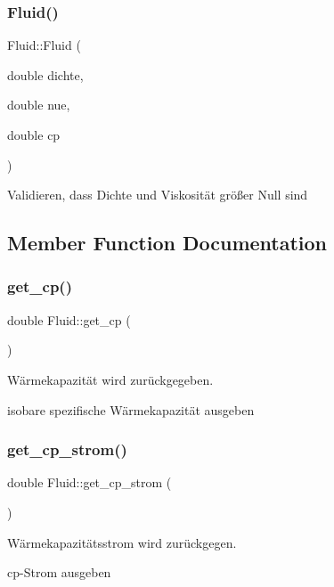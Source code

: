 \subsubsection{\texorpdfstring{Fluid()}{Fluid()}}
{\footnotesize\ttfamily Fluid\+::\+Fluid (\begin{DoxyParamCaption}\item[{double}]{dichte,  }\item[{double}]{nue,  }\item[{double}]{cp }\end{DoxyParamCaption})}

Validieren, dass Dichte und Viskosität größer Null sind 

\subsection{Member Function Documentation}
\mbox{\label{class_fluid_a86bf10785c4c5822eabf9245f0b39ae0}} 
\subsubsection{\texorpdfstring{get\+\_\+cp()}{get\_cp()}}
{\footnotesize\ttfamily double Fluid\+::get\+\_\+cp (\begin{DoxyParamCaption}{ }\end{DoxyParamCaption})}



Wärmekapazität wird zurückgegeben. 

isobare spezifische Wärmekapazität ausgeben \mbox{\label{class_fluid_a5c589565d1bde26bc83125e3e8939796}} 
\subsubsection{\texorpdfstring{get\+\_\+cp\+\_\+strom()}{get\_cp\_strom()}}
{\footnotesize\ttfamily double Fluid\+::get\+\_\+cp\+\_\+strom (\begin{DoxyParamCaption}{ }\end{DoxyParamCaption})}



Wärmekapazitätsstrom wird zurückgegen. 

cp-\/\+Strom ausgeben \mbox{\label{class_fluid_acb9e3346c0871ad5fefc9d11dcfc3283}} 
